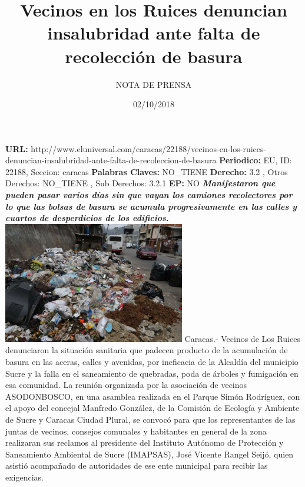 \documentclass{article}%
\title{\textbf{Vecinos en los Ruices denuncian insalubridad ante falta de recolección de basura}}%
\author{NOTA DE PRENSA}%
\date{02/10/2018}%
\begin{document}
%
\normalsize%
\maketitle%
\textbf{URL: }%
http://www.eluniversal.com/caracas/22188/vecinos{-}en{-}los{-}ruices{-}denuncian{-}insalubridad{-}ante{-}falta{-}de{-}recoleccion{-}de{-}basura\newline%
%
\textbf{Periodico: }%
EU, %
ID: %
22188, %
Seccion: %
caracas\newline%
%
\textbf{Palabras Claves: }%
NO\_TIENE\newline%
%
\textbf{Derecho: }%
3.2%
, Otros Derechos: %
NO\_TIENE%
, Sub Derechos: %
3.2.1%
\newline%
%
\textbf{EP: }%
NO\newline%
\newline%
%
\textbf{\textit{Manifestaron que pueden pasar varios días sin que vayan los camiones recolectores por lo que las bolsas de basura se acumula progresivamente en las calles y cuartos de desperdicios de los edificios.}}%
\newline%
\newline%
%
\includegraphics[width=300px]{172.JPG}%
\newline%
%
Caracas.{-} Vecinos de Los Ruices denunciaron la situación sanitaria que padecen producto de la acumulación de basura en las aceras, calles y avenidas, por ineficacia de la Alcaldía del municipio Sucre y la falla en el saneamiento de quebradas, poda de árboles y fumigación en esa comunidad.%
\newline%
%
La reunión organizada por la asociación de vecinos ASODONBOSCO, en una asamblea realizada en el Parque Simón Rodríguez, con el apoyo del concejal Manfredo González, de la Comisión de Ecología y Ambiente de Sucre y Caracas Ciudad Plural, se convocó para que los representantes de las juntas de vecinos, consejos comunales y habitantes en general de la zona realizaran sus reclamos al presidente del Instituto Autónomo de Protección y Saneamiento Ambiental de Sucre (IMAPSAS), José Vicente Rangel Seijó, quien asistió acompañado de autoridades de ese ente municipal para recibir las exigencias.%
\end{document}
